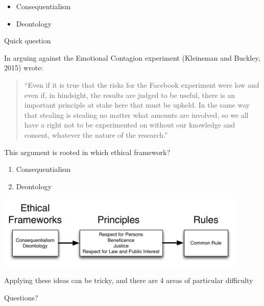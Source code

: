 \documentclass{beamer}
\begin{document}
\begin{frame}

\begin{itemize}
\item Consequentialism
\item Deontology
\end{itemize}

\end{frame}
\begin{frame} {Quick question}

In arguing against the Emotional Contagion experiment (Kleinsman and Buckley, 2015) wrote:
\begin{quote}
``Even if it is true that the risks for the Facebook experiment were low and even if, in hindsight, the results are judged to be useful, there is an important principle at stake here that must be upheld.  In the same way that stealing is stealing no matter what amounts are involved, so we all have a right not to be experimented on without our knowledge and consent, whatever the nature of the research.'' 
\end{quote}
This argument is rooted in which ethical framework?
\begin{enumerate}
\item Consequentialism
\item Deontology
\end{enumerate}

\end{frame}
\begin{frame}

\begin{center}
\includegraphics[width=0.9\textwidth]{figures/ethics_schematic_simple.png}
\end{center}

\end{frame}
\begin{frame}

Applying these ideas can be tricky, and there are 4 areas of particular difficulty

\end{frame}
\begin{frame}

\begin{center}
\LARGE
Questions?
\end{center}

\end{frame}
\end{document}
